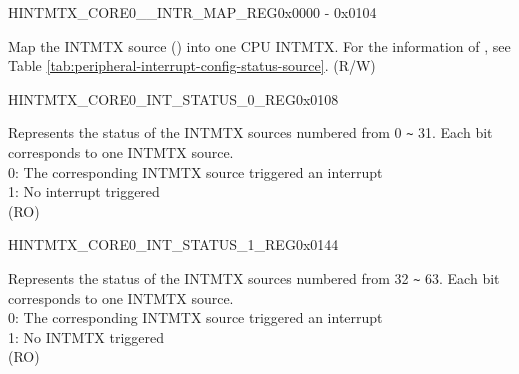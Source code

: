 \begin{register}{H}{INTMTX\_CORE0\_\_INTR\_MAP\_REG}{0x0000 - 0x0104}\label{INTMTXCORE0SOURCEINTRMAPREG}
%
%
\regnewline%
\begin{regdesc}\begin{reglist}
\label{INTMTXCORE0SOURCEINTRMAP}\item [INTMTX\_CORE0\_\regindex{SOURCE}\_INTR\_MAP] Map the INTMTX source () into one CPU INTMTX. For the information of , see Table \ref{tab:peripheral-interrupt-config-status-source}. (R/W)
\end{reglist}\end{regdesc}
\end{register}


\begin{register}{H}{INTMTX\_CORE0\_INT\_STATUS\_0\_REG}{0x0108}\label{regdesc:INTMTXCORE0INTSTATUS0REG}
%
\regnewline%
\begin{regdesc}\begin{reglist}
\label{fielddesc:INTMTXCORE0INTSTATUS0}\item [INTMTX\_CORE0\_INT\_STATUS\_0] Represents the status of the INTMTX sources numbered from 0 \verb+~+ 31. Each bit corresponds to one INTMTX source.\\
0: The corresponding INTMTX source triggered an interrupt \\
1: No interrupt triggered \\(RO)
\end{reglist}\end{regdesc}
\end{register}


\begin{register}{H}{INTMTX\_CORE0\_INT\_STATUS\_1\_REG}{0x0144}\label{regdesc:INTMTXCORE0INTSTATUS1REG}
%
\regnewline%
\begin{regdesc}\begin{reglist}
\label{fielddesc:INTMTXCORE0INTSTATUS1}\item [INTMTX\_CORE0\_INT\_STATUS\_1] Represents the status of the INTMTX sources numbered from 32 \verb+~+ 63. Each bit corresponds to one INTMTX source.\\
0: The corresponding INTMTX source triggered an interrupt \\
1: No INTMTX triggered \\(RO)
\end{reglist}\end{regdesc}
\end{register}

